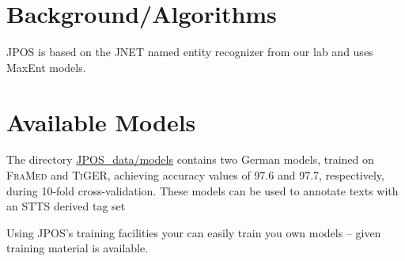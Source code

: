 \documentclass[11pt,a4paper,halfparskip]{scrartcl}
\begin{document}
\section{Background/Algorithms}
\label{sec:background}

JPOS is based on the JNET named entity recognizer from our lab and uses MaxEnt models.

\section{Available Models}

The directory \url{JPOS_data/models} contains two German models, trained on \textsc{FraMed} \cite{wermter.lrec04} and \textsc{TiGER}, achieving accuracy values of 97.6 and 97.7, respectively, during 10-fold cross-validation. These models can be used to annotate texts with an STTS derived tag set \cite{wermter.lrec04,stts}

Using JPOS's training facilities your can easily train you own models
-- given training material is available.




\end{document}
